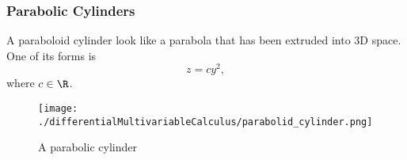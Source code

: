 \subsubsection{Parabolic Cylinders}
\noindent
A paraboloid cylinder look like a parabola that has been extruded into 3D space. One of its forms is
\begin{equation*}
	z = cy^2,
\end{equation*} 
where $c \in \R$.

\begin{figure}[H]
	\centering
	\texttt{[image: ./differentialMultivariableCalculus/parabolid\_cylinder.png]}
	\caption{A parabolic cylinder}
\end{figure}